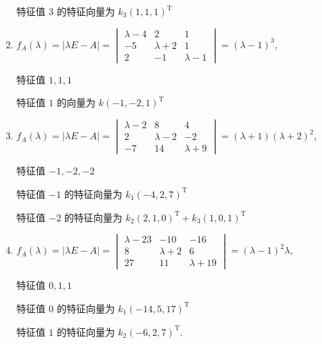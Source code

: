 \begin{enumerate}
			       特征值 \( 3 \) 的特征向量为 \( k_3(1, 1, 1)^{\mathrm{T}} \)
			 \item %
			       \( f_{A}(\lambda) = |\lambda E - A| = \begin{vmatrix}
				       \lambda - 4 & 2           & 1           \\
				       -5          & \lambda + 2 & 1           \\
				       2           & -1          & \lambda - 1
			       \end{vmatrix} = (\lambda - 1)^{3} \),

			       特征值 \( 1, 1, 1 \)

			       特征值 \( 1 \) 的向量为 \( k(-1, -2, 1)^{\mathrm{T}} \)
			 \item %
			       \( f_{A}(\lambda) = |\lambda E - A| = \begin{vmatrix}
				       \lambda - 2 & 8           & 4           \\
				       2           & \lambda - 2 & -2          \\
				       -7          & 14          & \lambda + 9
			       \end{vmatrix} = (\lambda + 1)(\lambda + 2)^{2} \),

			       特征值 \( -1, -2, -2 \)

			       特征值 \( -1 \) 的特征向量为 \( k_1(-4, 2, 7)^{\mathrm{T}} \)

			       特征值 \( -2 \) 的特征向量为 \( k_2(2, 1, 0)^{\mathrm{T}} + k_3(1, 0, 1)^{\mathrm{T}} \)
			 \item %
			       \( f_{A}(\lambda) = |\lambda E - A| = \begin{vmatrix}
				       \lambda - 23 & -10         & -16          \\
				       8            & \lambda + 2 & 6            \\
				       27           & 11          & \lambda + 19
			       \end{vmatrix} = (\lambda - 1)^{2}\lambda \),

			       特征值 \( 0, 1, 1 \)

			       特征值 \( 0 \) 的特征向量为 \( k_1(-14, 5, 17)^{\mathrm{T}} \)

			       特征值 \( 1 \) 的特征向量为 \( k_2(-6, 2, 7)^{\mathrm{T}} \).
		 \end{enumerate}

